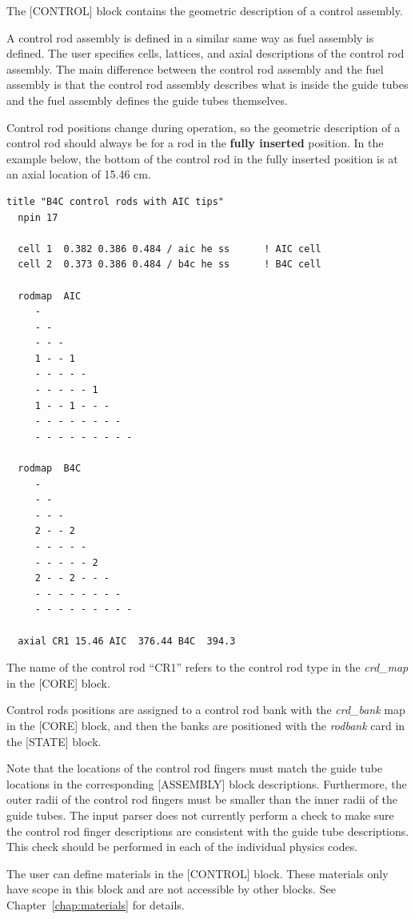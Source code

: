 The [CONTROL] block contains the geometric description of a control assembly.

A control rod assembly is defined in a similar same way as fuel assembly is defined.
The user specifies cells, lattices, and axial descriptions of the control rod assembly.
The main difference between the control rod assembly and the fuel assembly is that
the control rod assembly describes what is inside the guide tubes and the fuel assembly
defines the guide tubes themselves.

Control rod positions change during operation, so the geometric description of a control rod
should always be for a rod in the {\bf fully inserted} position.
In the example below, the bottom of the control rod in the fully inserted position is
at an axial location of 15.46 cm.

\begin{Verbatim}[fontsize=\small]
  title "B4C control rods with AIC tips"
  npin 17

  cell 1  0.382 0.386 0.484 / aic he ss      ! AIC cell
  cell 2  0.373 0.386 0.484 / b4c he ss      ! B4C cell

  rodmap  AIC
     -
     - -
     - - -
     1 - - 1
     - - - - -
     - - - - - 1
     1 - - 1 - - -
     - - - - - - - -
     - - - - - - - - -

  rodmap  B4C
     -
     - -
     - - -
     2 - - 2
     - - - - -
     - - - - - 2
     2 - - 2 - - -
     - - - - - - - -
     - - - - - - - - -

  axial CR1 15.46 AIC  376.44 B4C  394.3
\end{Verbatim}

The name of the control rod ``CR1'' refers to the control rod type in the
{\it crd\_map} in the [CORE] block.

Control rods positions are assigned to a control rod bank with the {\it crd\_bank} map
in the [CORE] block, and then the banks are positioned with the
{\it rodbank} card in the [STATE] block.

Note that the locations of the control rod fingers must match the guide tube locations in the
corresponding [ASSEMBLY] block descriptions.  Furthermore, the outer radii of the control
rod fingers must be smaller than the inner radii of the guide tubes.
The input parser does not currently perform a check to make sure the control rod finger
descriptions are consistent with the guide tube descriptions.
This check should be performed in each of the individual physics codes.

The user can define materials in the [CONTROL] block.  These materials only have scope in
this block and are not accessible by other blocks.  See Chapter~\ref{chap:materials} for details.

